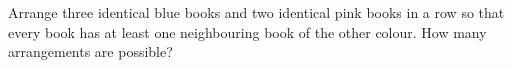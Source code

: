 Arrange three identical blue books and two identical pink books in a row so that every book has at least one neighbouring book of the other colour. How many arrangements are possible?
